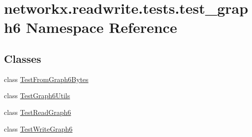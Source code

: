 \hypertarget{namespacenetworkx_1_1readwrite_1_1tests_1_1test__graph6}{}\section{networkx.\+readwrite.\+tests.\+test\+\_\+graph6 Namespace Reference}
\label{namespacenetworkx_1_1readwrite_1_1tests_1_1test__graph6}
\subsection*{Classes}
\begin{DoxyCompactItemize}
\item 
class \hyperlink{classnetworkx_1_1readwrite_1_1tests_1_1test__graph6_1_1TestFromGraph6Bytes}{Test\+From\+Graph6\+Bytes}
\item 
class \hyperlink{classnetworkx_1_1readwrite_1_1tests_1_1test__graph6_1_1TestGraph6Utils}{Test\+Graph6\+Utils}
\item 
class \hyperlink{classnetworkx_1_1readwrite_1_1tests_1_1test__graph6_1_1TestReadGraph6}{Test\+Read\+Graph6}
\item 
class \hyperlink{classnetworkx_1_1readwrite_1_1tests_1_1test__graph6_1_1TestWriteGraph6}{Test\+Write\+Graph6}
\end{DoxyCompactItemize}
